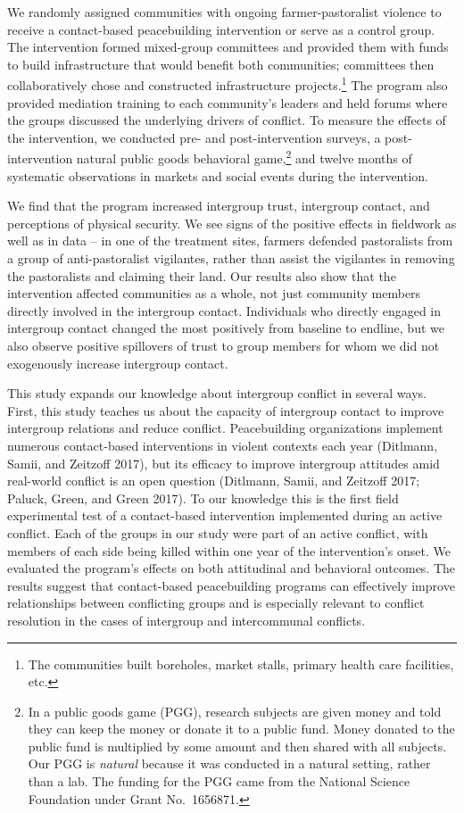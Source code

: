\documentclass[11pt]{article}
\begin{document}
We randomly assigned communities with ongoing farmer-pastoralist
violence to receive a contact-based peacebuilding intervention or serve
as a control group. The intervention formed mixed-group committees and
provided them with funds to build infrastructure that would benefit both
communities; committees then collaboratively chose and constructed
infrastructure projects.\footnote{The communities built boreholes,
  market stalls, primary health care facilities, etc.} The program also
provided mediation training to each community's leaders and held forums
where the groups discussed the underlying drivers of conflict. To
measure the effects of the intervention, we conducted pre- and
post-intervention surveys, a post-intervention natural public goods
behavioral game,\footnote{In a public goods game (PGG), research
  subjects are given money and told they can keep the money or donate it
  to a public fund. Money donated to the public fund is multiplied by
  some amount and then shared with all subjects. Our PGG is
  \emph{natural} because it was conducted in a natural setting, rather
  than a lab. The funding for the PGG came from the National Science
  Foundation under Grant No.~1656871.} and twelve months of systematic
observations in markets and social events during the intervention.

We find that the program increased intergroup trust, intergroup contact,
and perceptions of physical security. We see signs of the positive
effects in fieldwork as well as in data -- in one of the treatment
sites, farmers defended pastoralists from a group of anti-pastoralist
vigilantes, rather than assist the vigilantes in removing the
pastoralists and claiming their land. Our results also show that the
intervention affected communities as a whole, not just community members
directly involved in the intergroup contact. Individuals who directly
engaged in intergroup contact changed the most positively from baseline
to endline, but we also observe positive spillovers of trust to group
members for whom we did not exogenously increase intergroup contact.

This study expands our knowledge about intergroup conflict in several
ways. First, this study teaches us about the capacity of intergroup
contact to improve intergroup relations and reduce conflict.
Peacebuilding organizations implement numerous contact-based
interventions in violent contexts each year (Ditlmann, Samii, and
Zeitzoff 2017), but its efficacy to improve intergroup attitudes amid
real-world conflict is an open question (Ditlmann, Samii, and Zeitzoff
2017; Paluck, Green, and Green 2017). To our knowledge this is the first
field experimental test of a contact-based intervention implemented
during an active conflict. Each of the groups in our study were part of
an active conflict, with members of each side being killed within one
year of the intervention's onset. We evaluated the program's effects on
both attitudinal and behavioral outcomes. The results suggest that
contact-based peacebuilding programs can effectively improve
relationships between conflicting groups and is especially relevant to
conflict resolution in the cases of intergroup and intercommunal
conflicts.
\end{document}
